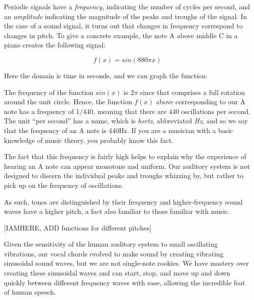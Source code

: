 \documentclass[UTF8]{book}
\begin{document}
\begin{CJK}{UTF8}{gbsn}
Periodic signals have a \emph{frequency}, indicating the number of cycles per second, and an \emph{amplitude} indicating the magnitude of the peaks and troughs of the signal. In the case of a sound signal, it turns out that changes in frequency correspond to changes in pitch. To give a concrete example, the note A above middle C in a piano creates the following signal:

\[ f(x) = sin(880\pi x) \]

Here the domain is time in seconds, and we can graph the function:


The frequency of the function $sin(x)$ is $2\pi$ since that comprises a full rotation around the unit circle. Hence, the function $f(x)$ above corresponding to our A note has a frequency of 1/440, meaning that there are 440 oscillations per second. The unit ``per second'' has a name, which is \emph{hertz}, abbreviated \emph{Hz}, and so we say that the frequency of an A note is 440Hz. If you are a musician with a basic knowledge of music theory, you probably know this fact.

The fact that this frequency is fairly high helps to explain why the experience of hearing an A note can appear monotone and uniform. Our auditory system is not designed to discern the individual peaks and troughs whizzing by, but rather to pick up on the frequency of oscillations.

As such, tones are distinguished by their frequency and higher-frequency sound waves have a higher pitch, a fact also familiar to those familiar with music.

[IAMHERE, ADD functions for different pitches]

Given the sensitivity of the human auditory system to small oscillating vibrations, our vocal chords evolved to make sound by creating vibrating sinusoidal sound waves, but we are not single-note rookies. We have mastery over creating these sinusoidal waves and can start, stop, and move up and down quickly between different frequency waves with ease, allowing the incredible feat of human speech.


\end{CJK}
\end{document}

